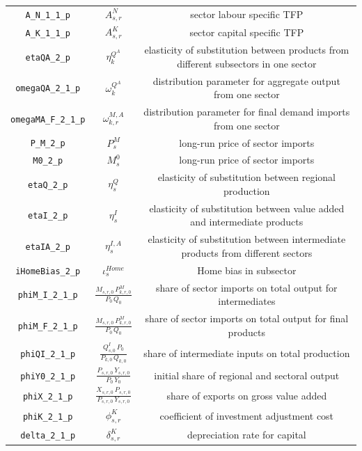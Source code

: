 \begin{center}
\begin{longtable}{ccc}
\texttt{A\_N\_1\_1\_p} & ${A^{N}_{s,r}}$ & sector labour specific TFP\\
\texttt{A\_K\_1\_1\_p} & ${A^{K}_{s,r}}$ & sector capital specific TFP\\
\texttt{etaQA\_2\_p} & ${\eta^{Q^A}_{k}}$ & elasticity of substitution between products from different subsectors in one sector\\
\texttt{omegaQA\_2\_1\_p} & ${\omega^{Q^A}_{k}}$ & distribution parameter for aggregate output from one sector\\
\texttt{omegaMA\_F\_2\_1\_p} & ${\omega^{M,A}_{k,r}}$ & distribution parameter for final demand imports from one sector\\
\texttt{P\_M\_2\_p} & ${P^{M}_{s}}$ & long-run price of sector imports\\
\texttt{M0\_2\_p} & ${M^{0}_{s}}$ & long-run price of sector imports\\
\texttt{etaQ\_2\_p} & ${\eta^{Q}_{s}}$ & elasticity of substitution between regional production\\
\texttt{etaI\_2\_p} & ${\eta^{I}_{s}}$ & elasticity of substitution between value added and intermediate products\\
\texttt{etaIA\_2\_p} & ${\eta^{I,A}_{s}}$ & elasticity of substitution between intermediate products from different sectors\\
\texttt{iHomeBias\_2\_p} & ${\iota^{Home}_{s}}$ & Home bias in subsector\\
\texttt{phiM\_I\_2\_1\_p} & $\frac{M_{s,r,0} \, P^{M}_{k,r,0}}{P_{0} \, Q_{0}}$ & share of sector imports on total output for intermediates\\
\texttt{phiM\_F\_2\_1\_p} & $\frac{M_{s,r,0} \, P^{M}_{k,r,0}}{P_{0} \, Q_{0}}$ & share of sector imports on total output for final products\\
\texttt{phiQI\_2\_1\_p} & $\frac{Q^{I}_{s,0} \, P_{0}}{P_{k,0} \, Q_{k,0}}$ & share of intermediate inputs on total production\\
\texttt{phiY0\_2\_1\_p} & $\frac{P_{s,r,0} \, Y_{s,r,0}}{P_{0} \, Y_{0}}$ & initial share of regional and sectoral output\\
\texttt{phiX\_2\_1\_p} & $\frac{X_{s,r,0} \, P_{s,r,0}}{P_{s,r,0} \, Y_{s,r,0}}$ & share of exports on gross value added\\
\texttt{phiK\_2\_1\_p} & ${\phi^{K}_{s,r}}$ & coefficient of investment adjustment cost\\
\texttt{delta\_2\_1\_p} & ${\delta^{K}_{s,r}}$ & depreciation rate for capital\\

\end{longtable}
\end{center}
